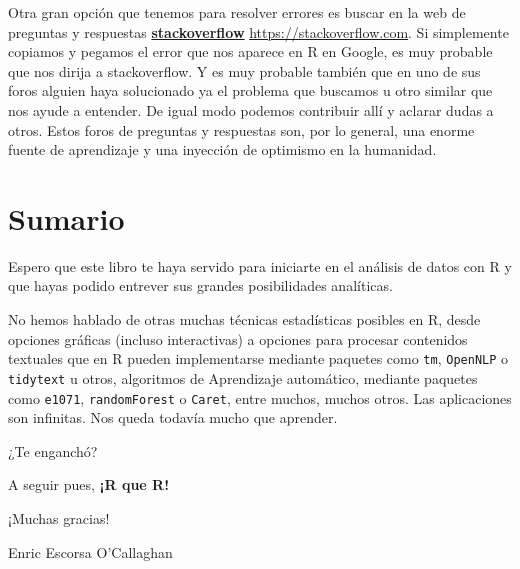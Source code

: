 \documentclass[]{book}
\theoremstyle{definition}
\theoremstyle{definition}
\theoremstyle{definition}
\theoremstyle{remark}
\begin{document}
Otra gran opción que tenemos para resolver errores es buscar en la web
de preguntas y respuestas
\href{https://stackoverflow.com}{\textbf{stackoverflow}}
\url{https://stackoverflow.com}. Si simplemente copiamos y pegamos el
error que nos aparece en R en Google, es muy probable que nos dirija a
stackoverflow. Y es muy probable también que en uno de sus foros alguien
haya solucionado ya el problema que buscamos u otro similar que nos
ayude a entender. De igual modo podemos contribuir allí y aclarar dudas
a otros. Estos foros de preguntas y respuestas son, por lo general, una
enorme fuente de aprendizaje y una inyección de optimismo en la
humanidad.

\hypertarget{sumario}{%
\chapter{Sumario}\label{sumario}}

Espero que este libro te haya servido para iniciarte en el análisis de
datos con R y que hayas podido entrever sus grandes posibilidades
analíticas.

No hemos hablado de otras muchas técnicas estadísticas posibles en R,
desde opciones gráficas (incluso interactivas) a opciones para procesar
contenidos textuales que en R pueden implementarse mediante paquetes
como \texttt{tm}, \texttt{OpenNLP} o \texttt{tidytext} u otros,
algoritmos de Aprendizaje automático, mediante paquetes como
\texttt{e1071}, \texttt{randomForest} o \texttt{Caret}, entre muchos,
muchos otros. Las aplicaciones son infinitas. Nos queda todavía mucho
que aprender.

¿Te enganchó?

A seguir pues, \textbf{¡R que R!}

¡Muchas gracias!

Enric Escorsa O'Callaghan


\end{document}
